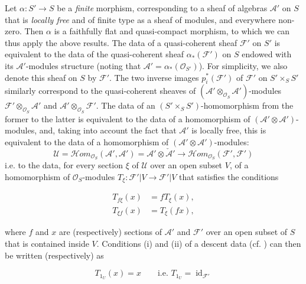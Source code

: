 Let $\alpha\colon S'\to S$ be a \emph{finite} morphism, corresponding to a sheaf of algebras $\mathcal{A}'$ on $S$ that is \emph{locally free} and of finite type as a sheaf of modules, and everywhere non-zero.
Then $\alpha$ is a faithfully flat and quasi-compact morphism, to which we can thus apply the above results.
The data of a quasi-coherent sheaf $\mathcal{F}'$ on $S'$ is equivalent to the data of the quasi-coherent sheaf $\alpha_*(\mathcal{F}')$ on $S$ endowed with its $\mathcal{A}'$-modules structure (noting that $\mathcal{A}'=\alpha_*(\mathcal{O}_{S'})$).
For simplicity, we also denote this sheaf on $S$ by $\mathcal{F}'$.
The two inverse images $p_i^*(\mathcal{F}')$ of $\mathcal{F}'$ on $S'\times_S S'$ similarly correspond to the quasi-coherent sheaves of $(\mathcal{A}'\otimes_{\mathcal{O}_S}\mathcal{A}')$-modules $\mathcal{F}'\otimes_{\mathcal{O}_S}\mathcal{A}'$ and $\mathcal{A}'\otimes_{\mathcal{O}_S}\mathcal{F}'$.
The data of an $(S'\times_S S')$-homomorphism from the former to the latter is equivalent to the data of a homomorphism of $(\mathcal{A}'\otimes\mathcal{A}')$-modules, and, taking into account the fact that $\mathcal{A}'$ is locally free, this is equivalent to the data of a homomorphism of $(\mathcal{A}'\otimes\mathcal{A}')$-modules:
\[
    \mathcal{U}
    = \mathcal{H}om_{\mathcal{O}_S}(\mathcal{A}',\mathcal{A}')
    = \mathcal{A}'\otimes\check{\mathcal{A}}'
    \to \mathcal{H}om_{\mathcal{O}_S}(\mathcal{F}',\mathcal{F}')
\]
i.e. to the data, for every section $\xi$ of $\mathcal{U}$ over an open subset $V$, of a homomorphism of $\mathcal{O}_S$-modules $T_\xi\colon\mathcal{F}'|V\to\mathcal{F}'|V$ that satisfies the conditions

\begin{equation}\tag{3.1}\label{fga3.i-b.3-equation-3.1}
    \begin{aligned}
        T_{f\xi}(x)
         & = fT_\xi(x),
        \\T_{\xi f}(x)
         & = T_\xi(fx),
    \end{aligned}
\end{equation}

where $f$ and $x$ are (respectively) sections of $\mathcal{A}'$ and $\mathcal{F}'$ over an open subset of $S$ that is contained inside $V$.
Conditions (i) and (ii) of a descent data (cf. ) can then be written (respectively) as

\begin{equation}\tag{3.2}\label{fga3.i-b.3-equation-3.2}
    T_{1_U}(x) = x \qquad\text{i.e. }T_{1_U}=\operatorname{id}_{\mathcal{F}'}
\end{equation}

